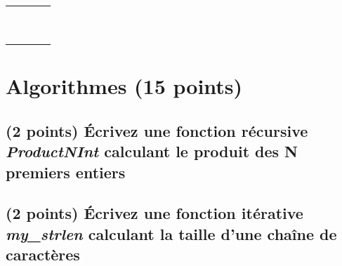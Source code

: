 \documentclass[11pt,a4paper]{article}
\begin{document}
\begin{table}[h!]
\begin{minipage}{0.4\textwidth}
\begin{tabular}{| C{1cm} | C{1cm} | C{1cm} | C{1cm} |}
        \hline
             &     &     &       \\
             &     &     &       \\
             &     &     &       \\
        \hline
             &     &     &       \\
             &     &     &       \\
             &     &     &       \\
        \hline
             &     &     &       \\
             &     &     &       \\
             &     &     &       \\
        \hline
    \end{tabular}
  \end{minipage}
\end{table}


\bigskip

\vfillLast
\clearpage

\section{Algorithmes (15 points)}

\subsection{(2 points) \'Ecrivez une fonction récursive \og \textit{ProductNInt} \fg{} calculant le produit des N premiers entiers }

\bigskip

\begin{center}
\end{center}

\bigskip


\subsection{(2 points) \'Ecrivez une fonction itérative \og \textit{my\_strlen} \fg{} calculant la taille d'une chaîne de caractères }

\bigskip

\begin{center}
\end{center}
\end{document}
